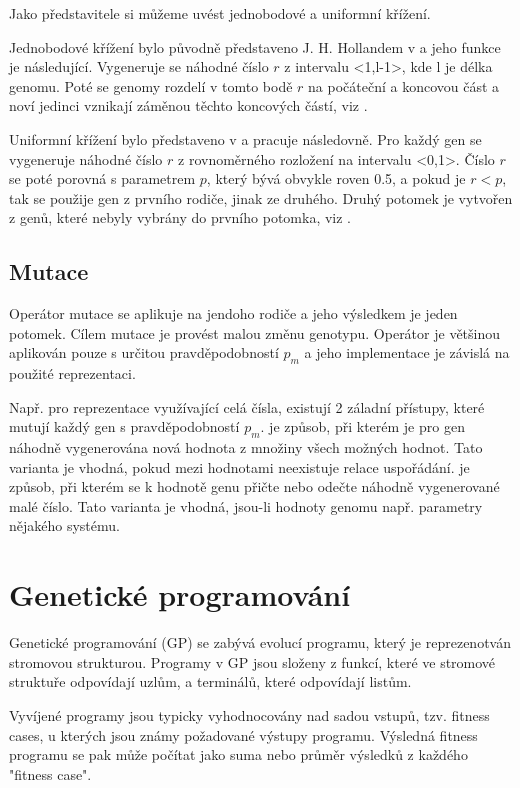 Jako představitele si můžeme uvést jednobodové a uniformní křížení.

Jednobodové křížení bylo původně představeno J. H. Hollandem v  a jeho funkce je následující.
Vygeneruje se náhodné číslo $r$ z intervalu  <1,l-1>, kde l je délka genomu.
Poté se genomy rozdelí v tomto bodě $r$ na počáteční a koncovou část a noví jedinci vznikají záměnou těchto koncových částí, viz .

Uniformní křížení bylo představeno v  a pracuje následovně.
Pro každý gen se vygeneruje náhodné číslo $r$ z rovnoměrného rozložení na intervalu <0,1>.
Číslo $r$ se poté porovná s parametrem $p$, který bývá obvykle roven 0.5, a pokud je $r < p$, tak se použije gen z prvního rodiče, jinak ze druhého.
Druhý potomek je vytvořen z genů, které nebyly vybrány do prvního potomka, viz .

\subsection{Mutace}
Operátor mutace se aplikuje na jendoho rodiče a jeho výsledkem je jeden potomek.
Cílem mutace je provést malou změnu genotypu.
Operátor je většinou aplikován pouze s určitou pravděpodobností $p_m$ a jeho implementace je závislá na použité reprezentaci.


Např. pro reprezentace využívající celá čísla, existují 2 záladní přístupy, které mutují každý gen s pravděpodobností $p_m$.
 je způsob, při kterém je pro gen náhodně vygenerována nová hodnota z množiny všech možných hodnot.
Tato varianta je vhodná, pokud mezi hodnotami neexistuje relace uspořádání.
 je způsob, při kterém se k hodnotě genu přičte nebo odečte náhodně vygenerované malé číslo.
Tato varianta je vhodná, jsou-li hodnoty genomu např. parametry nějakého systému.


\section{Genetické programování}
Genetické programování (GP) se zabývá evolucí programu, který je reprezenotván stromovou strukturou.
Programy v GP jsou složeny z funkcí, které ve stromové struktuře odpovídají uzlům, a terminálů, které odpovídají listům.

Vyvíjené programy jsou typicky vyhodnocovány nad sadou vstupů, tzv. fitness cases, u kterých jsou známy požadované výstupy programu.
Výsledná fitness programu se pak může počítat jako suma nebo průměr výsledků z každého "fitness case".

